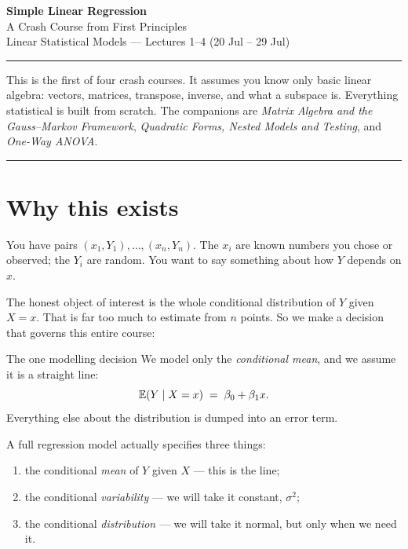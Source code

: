 \documentclass[11pt]{article}
\begin{document}
\begin{center}
{\LARGE\bfseries Simple Linear Regression}\\[4pt]
{\large A Crash Course from First Principles}\\[3pt]
{\small Linear Statistical Models --- Lectures 1--4 (20 Jul -- 29 Jul)}
\end{center}
\vspace{2pt}\hrule\vspace{10pt}

\noindent This is the first of four crash courses. It assumes you know only basic linear
algebra: vectors, matrices, transpose, inverse, and what a subspace is. Everything
statistical is built from scratch. The companions are
\textit{Matrix Algebra and the Gauss--Markov Framework},
\textit{Quadratic Forms, Nested Models and Testing}, and
\textit{One-Way ANOVA}.

\tableofcontents
\vspace{8pt}\hrule\vspace{10pt}

\section{Why this exists}

You have pairs $(x_1,Y_1),\dots,(x_n,Y_n)$. The $x_i$ are known numbers you chose or
observed; the $Y_i$ are random. You want to say something about how $Y$ depends on $x$.

The honest object of interest is the whole conditional distribution of $Y$ given $X=x$.
That is far too much to estimate from $n$ points. So we make a decision that governs
this entire course:

\begin{idea}{The one modelling decision}
We model only the \emph{conditional mean}, and we assume it is a straight line:
\[
  \mathbb{E}(Y \mid X = x) \;=\; \beta_0 + \beta_1 x .
\]
Everything else about the distribution is dumped into an error term.
\end{idea}

A full regression model actually specifies three things:
\begin{enumerate}[label=(\alph*)]
  \item the conditional \emph{mean} of $Y$ given $X$ --- this is the line;
  \item the conditional \emph{variability} --- we will take it constant, $\sigma^2$;
  \item the conditional \emph{distribution} --- we will take it normal, but only when we
        need it.
\end{enumerate}
\end{document}
